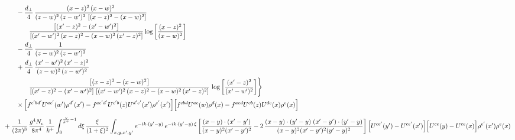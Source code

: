 \documentclass[10pt]{article}
\numberwithin{equation}{section}
\begin{document}
\begin{align}
&\qquad-\frac{d_{\perp}}{4}\,\frac{(x-z)^{2}\, (x-w)^{2}}{(z-w)^{2}\, (z-w^{\prime})^{2}\,\left[(x-z)^{2} - (x-w)^{2}\right]}\notag\\&\qquad\qquad  \frac{\left[(x^{\prime}-z)^{2}-(x^{\prime}-w^{\prime})^{2}\right]}{\left[(x^{\prime}-w^{\prime})^{2}\, (x-z)^{2} - (x-w)^{2}\, (x^{\prime}-z)^{2}\right]} \log{\left[\frac{(x-z)^{2}}{(x-w)^{2}}\right]}\notag\\
&\qquad-\frac{d_{\perp}}{4}\,\frac{1}{(z-w)^{2}\, (z-w^{\prime})^{2}}\notag\\
&\qquad+\frac{d_{\perp}}{4}\,\frac{(x^{\prime}-w^{\prime})^{2}\, (x^{\prime}-z)^{2}}{(z-w)^{2}\, (z-w^{\prime})^{2}}\notag\\&\qquad\qquad  \frac{\left[(x-z)^{2} - (x-w)^{2}\right]}{\left[(x^{\prime}-z)^{2} - (x^{\prime}-w^{\prime})^{2}\right]\, \left[(x^{\prime}-w^{\prime})^{2}\, (x - z)^{2} - (x-w)^{2}\,(x^{\prime}-z)^{2}\right]}\, \log{\left[\frac{(x^{\prime}-z)^{2}}{(x^{\prime}-w^{\prime})^{2}}\right]}\Bigg\}\notag\\&\qquad\times\Big[f^{c^{\prime}bd^{\prime}}U^{ac^{\prime}}(w^{\prime})\rho^{d^{\prime}}(x^{\prime})-f^{ac^{\prime}d^{\prime}}U^{c^{\prime}b}(z)U^{d^{\prime}e^{\prime}}(x^{\prime})\rho^{e^{\prime}}(x^{\prime})\Big]\Big[f^{cbd}U^{ac}(w)\rho^{d}(x)-f^{acd}U^{cb}(z)U^{de}(x)\rho^{e}(x)\Big]\notag\\[6pt]
&+\frac{1}{(2\pi)^{3}}\,\frac{g^{4}N_{c}}{8\pi^{4}}\,\frac{1}{k^{+}}\int_{0}^{\frac{\vee}{k^{+}}-1}d\xi\,\frac{\xi}{(1+\xi)^{2}}\int_{x,y,x^{\prime},y^{\prime}}e^{-ik\cdot(y^{\prime}-y)}\,e^{-ik\cdot(y^{\prime}-y)\,\xi}\,\bigg[\frac{(x-y)\cdot(x^{\prime}-y^{\prime})}{(x-y)^{2}(x^{\prime}-y^{\prime})^{2}}-2\,\frac{(x-y)\cdot(y^{\prime}-y)\;(x^{\prime}-y^{\prime})\cdot(y^{\prime}-y)}{(x-y)^{2}(x^{\prime}-y^{\prime})^{2}(y^{\prime}-y)^{2}}\bigg]\,\Big[U^{ce^{\prime}}(y^{\prime})-U^{ce^{\prime}}(x^{\prime})\Big]\Big[U^{ce}(y)-U^{ce}(x)\Big]\rho^{e^{\prime}}(x^{\prime})\rho^{e}(x)
\end{align}
\newpage
\end{document}
